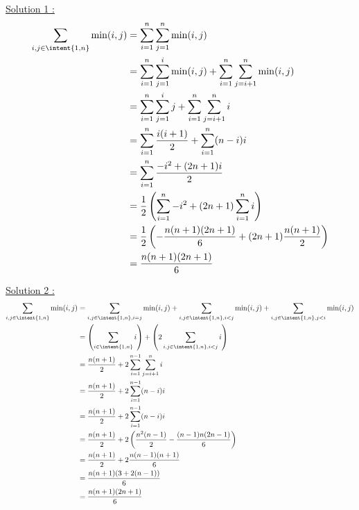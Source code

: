 \begin{correction}
\underline{Solution 1 :} 
\begin{align*}
\sum_{i,j \in \intent{1,n}} \min(i,j) &= \sum_{i=1}^n \sum_{j=1}^n\min(i,j)\\
												&= \sum_{i=1}^n \sum_{j=1}^i\min(i,j) + \sum_{i=1}^n \sum_{j=i+1}^n\min(i,j)\\
												&= \sum_{i=1}^n \sum_{j=1}^i j  + \sum_{i=1}^n \sum_{j=i+1}^n i\\
													&= \sum_{i=1}^n \frac{i(i+1)}{2}+ \sum_{i=1}^n (n-i) i\\
													&= \sum_{i=1}^n \frac{-i^2+(2n+1)i}{2}\\		
													&= \frac{1}{2} \left( \sum_{i=1}^n -i^2  + (2n+1)\sum_{i=1}^ni \right)\\																					&= \frac{1}{2} \left(-\frac{n(n+1)(2n+1)}{6} +(2n+1)\frac{n(n+1)}{2}\right)\\											
													&=\frac{n(n+1)(2n+1)}{6} 
\end{align*}



\underline{Solution 2 :}
\begin{align*}
\sum_{i,j \in \intent{1,n}} \min(i,j)  &= \sum_{i,j \in \intent{1,n}, i=j} \min(i,j)  +\sum_{i,j \in \intent{1,n}, i<j } \min(i,j)  + \sum_{i,j \in \intent{1,n}, j<i } \min(i,j) \\
										&=\left( \sum_{i \in \intent{1,n} } i \right) +\left(2\sum_{i,j \in \intent{1,n}, i< j } i \right)\\
										&= \frac{n(n+1)}{2} + 2 \sum_{i=1}^{n-1}\sum_{j=i+1}^n i \\
										&= \frac{n(n+1)}{2} + 2 \sum_{i=1}^{n-1}(n-i) i \\
										&= \frac{n(n+1)}{2} + 2 \sum_{i=1}^{n-1}(n-i) i \\
										&= \frac{n(n+1)}{2} + 2 \left( \frac{n^2(n-1)}{2}  - \frac{(n-1)n(2n-1)}{6}     \right)  \\
											&= \frac{n(n+1)}{2} + 2 \frac{n(n-1)(n+1)}{6} \\
											&= \frac{n(n+1) (3 +2(n-1))}{6} \\
											&= \frac{n(n+1) (2n+1)}{6} 
\end{align*}


\end{correction}








